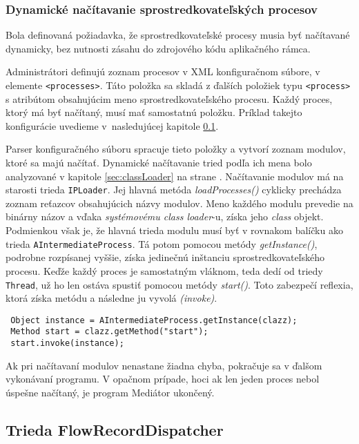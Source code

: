 \subsubsection{Dynamické načítavanie sprostredkovateľských procesov} \label{sec:intermediate_load}

Bola definovaná požiadavka, že sprostredkovateľské procesy musia byť načítavané dynamicky, bez nutnosti
zásahu do zdrojového kódu aplikačného rámca. 

Administrátori definujú zoznam procesov v XML konfiguračnom súbore, v elemente \verb|<processes>|. 
Táto položka sa skladá z ďalších položiek typu \verb|<process>| s atribútom 
obsahujúcim meno sprostredkovateľského procesu. Každý proces, ktorý má byť načítaný, musí mať 
samostatnú položku. Príklad takejto konfigurácie uvedieme v~nasledujúcej kapitole 
\ref{sec:FlowRecordDispatcher}.

Parser konfiguračného súboru spracuje tieto položky a vytvorí zoznam modulov, ktoré sa majú načítať.
Dynamické načítavanie tried podľa ich mena bolo analyzované v kapitole \ref{sec:classLoader} na strane
\pageref{sec:classLoader}. Načítavanie modulov má na starosti trieda \verb|IPLoader|. Jej hlavná metóda
\emph{loadProcesses()} cyklicky prechádza zoznam reťazcov obsahujúcich názvy modulov. Meno každého 
modulu prevedie na binárny názov a vďaka \emph{systémovému class loader}-u, získa jeho 
\emph{class} objekt. Podmienkou však je, že hlavná trieda modulu musí byť v rovnakom balíčku ako trieda
\verb|AIntermediateProcess|. Tá potom pomocou metódy \emph{getInstance()}, podrobne rozpísanej vyššie, 
získa jedinečnú inštanciu sprostredkovateľského procesu. Keďže každý proces je samostatným vláknom, teda 
dedí od triedy \verb|Thread|, už ho len ostáva spustiť pomocou metódy \emph{start()}. Toto zabezpečí 
reflexia, ktorá získa metódu a následne ju vyvolá \emph{(invoke)}.
\begin{verbatim}
 Object instance = AIntermediateProcess.getInstance(clazz);
 Method start = clazz.getMethod("start");
 start.invoke(instance);
\end{verbatim}

Ak pri načítavaní modulov nenastane žiadna chyba, pokračuje sa v ďalšom vykonávaní programu. V opačnom 
prípade, hoci ak len jeden proces nebol úspešne načítaný, je program Mediátor ukončený.




\subsection{Trieda FlowRecordDispatcher} \label{sec:FlowRecordDispatcher}

